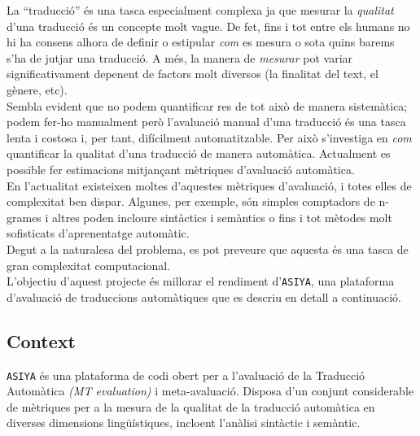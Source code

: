 \documentclass[11pt,a4paper]{article}
\begin{document}
La ``traducció'' és una tasca especialment complexa ja que mesurar la \emph{qualitat} d'una traducció és un concepte molt vague. De fet, fins i tot entre els humans no hi ha consens alhora de definir o estipular \emph{com} es mesura o sota quins barems s'ha de jutjar una traducció. A més, la manera de \emph{mesurar} pot variar significativament depenent de factors molt diversos (la finalitat del text, el gènere, etc).
\\

Sembla evident que no podem quantificar res de tot això de manera sistemàtica; podem fer-ho manualment però l'avaluació manual d'una traducció és una tasca lenta i costosa i, per tant, difícilment automatitzable. Per això s'investiga en \textit{com} quantificar la qualitat d'una traducció de manera automàtica. Actualment es possible fer estimacions mitjançant mètriques d'avaluació automàtica.
\\

En l'actualitat existeixen moltes d'aquestes mètriques d'avaluació, i totes elles de complexitat ben dispar. Algunes, per exemple, són simples comptadors de n-grames i altres poden incloure sintàctics i semàntics o fins i tot mètodes molt sofisticats d'aprenentatge automàtic.
\\

Degut a la naturalesa del problema, es pot preveure que aquesta és una tasca de gran complexitat computacional.
\\

L'objectiu d'aquest projecte és millorar el rendiment d'\texttt{ASIYA}, una plataforma d'avaluació de traduccions automàtiques que es descriu en detall a continuació.

\subsection{Context}

\texttt{ASIYA}\cite{asiya} és una plataforma de codi obert per a l'avaluació de la Traducció Automàtica \emph{(MT evaluation)} i meta-avaluació. Disposa d'un conjunt considerable de mètriques per a la mesura de la qualitat de la traducció automàtica en diverses dimensions lingüístiques, incloent l'anàlisi sintàctic i semàntic.
\\
\end{document}

